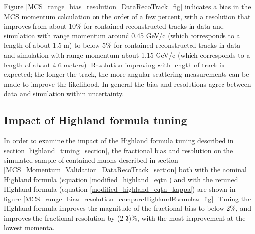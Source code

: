\documentclass[a4paper,11pt]{article}
\begin{document}
Figure \ref{MCS_range_bias_resolution_DataRecoTrack_fig} indicates a bias in the MCS momentum calculation on the order of a few percent, with a resolution that improves from about 10\% for contained reconstructed tracks in data and simulation with range momentum around 0.45 GeV/c (which corresponds to a length of about 1.5 m) to below 5\% for contained reconstructed tracks in data and simulation with range momentum about 1.15 GeV/c (which corresponds to a length of about 4.6 meters). Resolution improving with length of track is expected; the longer the track, the more angular scattering measurements can be made to improve the likelihood. In general the bias and resolutions agree between data and simulation within uncertainty.\\

\subsection{Impact of Highland formula tuning}\label{highland_formula_tuning_impact_section}

In order to examine the impact of the Highland formula tuning described in section \ref{highland_tuning_section}, the fractional bias and resolution on the simulated sample of contained muons described in section \ref{MCS_Momentum_Validation_DataRecoTrack_section} both with the nominal Highland formula (equation \ref{modified_highland_eqtn}) and with the retuned Highland formula (equation \ref{modified_highland_eqtn_kappa}) are shown in figure \ref{MCS_range_bias_resolution_compareHighlandFormulas_fig}. Tuning the Highland formula improves the magnitude of the fractional bias to below 2\%, and improves the fractional resolution by (2-3)\%, with the most improvement at the lowest momenta.
\end{document}
